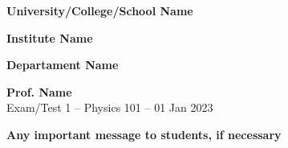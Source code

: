 \documentclass[9pt,twocolumn,english]{article}
\begin{document}
\textbf{University/College/School Name}

\textbf{Institute Name}

\textbf{Departament Name}

\textbf{Prof. Name}\\

Exam/Test 1 -- Physics 101 -- 01 Jan 2023\medskip{}

\textbf{Any important message to students, if necessary}\medskip{}
\end{document}
